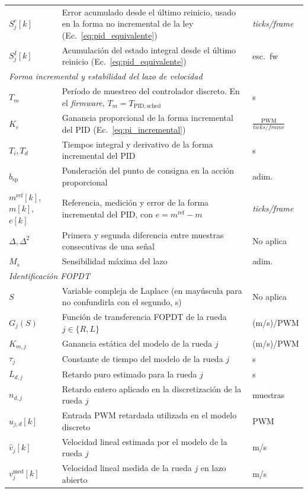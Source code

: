\begin{appendices}
{\begin{longtable}{p{2.7cm} p{8.5cm} p{2.2cm}}
$S_j^{e}[k]$ & Error acumulado desde el último reinicio, usado en la forma no incremental de la ley (Ec.~\eqref{eq:pid_equivalente}) & \textit{ticks/frame} \\
$S_j^{I}[k]$ & Acumulación del estado integral desde el último reinicio (Ec.~\eqref{eq:pid_equivalente}) & esc.\ fw \\
\multicolumn{3}{l}{\textit{Forma incremental y estabilidad del lazo de velocidad}}\\
$T_m$ & Período de muestreo del controlador discreto. En el \textit{firmware}, $T_m=T_{\mathrm{PID,sched}}$ & s \\
$K_c$ & Ganancia proporcional de la forma incremental del PID (Ec.~\eqref{eq:pi_incremental}) & $\frac{\text{PWM}}{\textit{ticks/frame}}$ \\
$T_i,T_d$ & Tiempos integral y derivativo de la forma incremental del PID & s \\
$b_{\mathrm{sp}}$ & Ponderación del punto de consigna en la acción proporcional & adim. \\
$m^{\mathrm{ref}}[k]$, $m[k]$, $e[k]$ & Referencia, medición y error de la forma incremental del PID, con $e=m^{\mathrm{ref}}-m$ & \textit{ticks/frame} \\
$\Delta,\Delta^{2}$ & Primera y segunda diferencia entre muestras consecutivas de una señal & No aplica \\
$M_s$ & Sensibilidad máxima del lazo & adim. \\
\multicolumn{3}{l}{\textit{Identificación FOPDT}}\\
$S$ & Variable compleja de Laplace (en mayúscula para no confundirla con el segundo, s) & No aplica \\
$G_j(S)$ & Función de transferencia FOPDT de la rueda $j\in\{R,L\}$ & (m/s)/PWM \\
$K_{m,j}$ & Ganancia estática del modelo de la rueda $j$ & (m/s)/PWM \\
$\tau_j$ & Constante de tiempo del modelo de la rueda $j$ & s \\
$L_{d,j}$ & Retardo puro estimado para la rueda $j$ & s \\
$n_{d,j}$ & Retardo entero aplicado en la discretización de la rueda $j$ & muestras \\
$u_{j,d}[k]$ & Entrada PWM retardada utilizada en el modelo discreto & PWM \\
$\hat{v}_j[k]$ & Velocidad lineal estimada por el modelo de la rueda $j$ & m/s \\
$v_j^{\mathrm{med}}[k]$ & Velocidad lineal medida de la rueda $j$ en lazo abierto & m/s \\

\end{longtable}}
\end{appendices}

